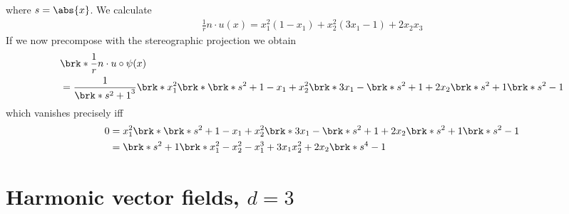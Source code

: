 \begin{example}
  where $s=\abs{x}$. We calculate
  \begin{align}
    \frac{1}{r}n\cdot u(x) = x_1^2(1-x_1)+x_2^2(3x_1-1)+2x_2x_3
  \end{align}
  If we now precompose with the stereographic projection we obtain
  \begin{align}
    &\brk*{\frac{1}{r}n\cdot u}\circ\psi (x) \\
    &= \frac{1}{\brk*{s^2+1}^3}\brk*{x_1^2\brk*{\brk*{s^2+1}-x_1}+x_2^2\brk*{3x_1-\brk*{s^2+1}}+2x_2\brk*{s^2+1}\brk*{s^2-1}}
  \end{align}
  which vanishes precisely iff
  \begin{align}
    0&=x_1^2\brk*{\brk*{s^2+1}-x_1}+x_2^2\brk*{3x_1-\brk*{s^2+1}}+2x_2\brk*{s^2+1}\brk*{s^2-1} \\
    &=\brk*{s^2+1}\brk*{x_1^2-x_2^2}-x_1^3+3x_1x_2^2+2x_2\brk*{s^4-1}
  \end{align}
\end{example}

\chapter{Harmonic vector fields, $d=3$}
